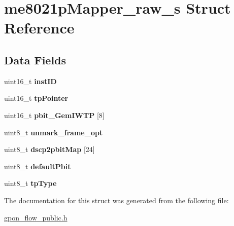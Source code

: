 \hypertarget{structme8021pMapper__raw__s}{}\section{me8021p\+Mapper\+\_\+raw\+\_\+s Struct Reference}
\label{structme8021pMapper__raw__s}
\subsection*{Data Fields}
\begin{DoxyCompactItemize}
\item 
\mbox{\label{structme8021pMapper__raw__s_abb7821835aab3697f71ce931129bbacc}} 
uint16\+\_\+t {\bfseries inst\+ID}
\item 
\mbox{\label{structme8021pMapper__raw__s_a9a4645df9c47a3504315f53b96a05817}} 
uint16\+\_\+t {\bfseries tp\+Pointer}
\item 
\mbox{\label{structme8021pMapper__raw__s_ad90b6f1ea50ebf29478301b55fcce4c3}} 
uint16\+\_\+t {\bfseries pbit\+\_\+\+Gem\+I\+W\+TP} \mbox{[}8\mbox{]}
\item 
\mbox{\label{structme8021pMapper__raw__s_abba9f0889ec185e0bdc49d5e81dad644}} 
uint8\+\_\+t {\bfseries unmark\+\_\+frame\+\_\+opt}
\item 
\mbox{\label{structme8021pMapper__raw__s_a278949e9458c9b0a854dd009644863c9}} 
uint8\+\_\+t {\bfseries dscp2pbit\+Map} \mbox{[}24\mbox{]}
\item 
\mbox{\label{structme8021pMapper__raw__s_a2e92ddb1feea4a29f380f6279f07ed3c}} 
uint8\+\_\+t {\bfseries default\+Pbit}
\item 
\mbox{\label{structme8021pMapper__raw__s_abbaabf9a8f24a22145d3316eea8e9caa}} 
uint8\+\_\+t {\bfseries tp\+Type}
\end{DoxyCompactItemize}


The documentation for this struct was generated from the following file\+:\begin{DoxyCompactItemize}
\item 
\hyperlink{gpon__flow__public_8h}{gpon\+\_\+flow\+\_\+public.\+h}\end{DoxyCompactItemize}
